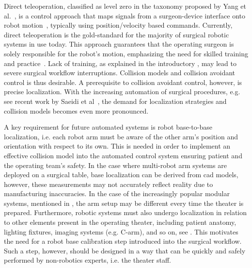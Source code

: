 Direct teleoperation, classified as level zero in the taxonomy proposed by Yang et al.~\cite{Yang2017}, is a control approach that maps signals from a surgeon-device interface onto robot motion~\cite{Niemeyer2008}, typically using position/velocity based commands.
Currently, direct teleoperation is the gold-standard for the majority of surgical robotic systems in use today. This approach guarantees that the operating surgeon is solely responsible for the robot's motion, emphasizing the need for skilled training and practice~\cite{Liu15}. Lack of training, as explained in the introductory , may lead to severe surgical workflow interruptions. Collision models and collision avoidant control is thus desirable. A prerequisite to collision avoidant control, however, is precise localization. With the increasing automation of surgical procedures, e.g. see recent work by Saeidi et al~\cite{Saeidi2022}, the demand for localization strategies and collision models becomes even more pronounced.


A key requirement for future automated systems is robot base-to-base localization, i.e. each robot arm must be aware of the other arm's position and orientation with respect to its own. This is needed in order to implement an effective collision model into the automated control system ensuring patient and the operating team's safety. In the case where multi-robot arm systems are deployed on a surgical table, base localization can be derived from \acrfull{cad} models, however, these measurements may not accurately reflect reality due to manufacturing inaccuracies. In the case of the increasingly popular modular systems, mentioned in , the arm setup may be different every time the theater is prepared. Furthermore, robotic systems must also undergo localization in relation to other elements present in the operating theater, including patient anatomy, lighting fixtures, imaging systems (e.g. C-arm), and so on, see . This motivates the need for a robot base calibration step introduced into the surgical workflow. Such a step, however, should be designed in a way that can be quickly and safely performed by non-robotics experts, i.e. the theater staff.


